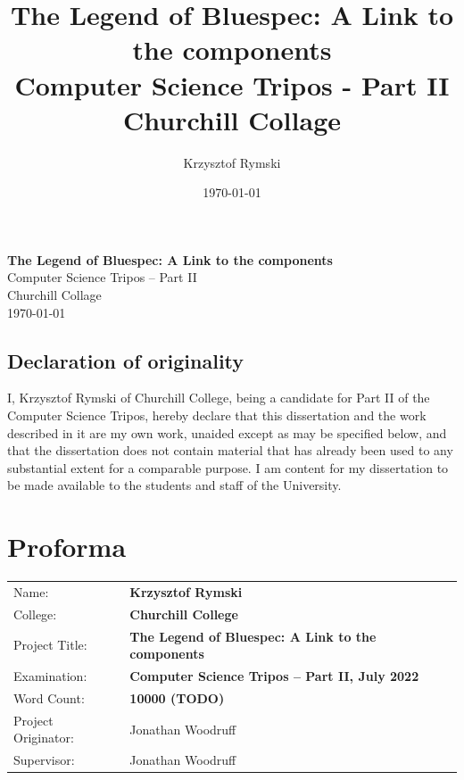 \documentclass[12pt]{report}
\title{The Legend of Bluespec: A Link to the components \\
\large Computer Science Tripos - Part II \\
Churchill Collage}
\date{\today}
\author{Krzysztof Rymski}
\begin{document}


\pagestyle{empty}


\vspace*{60mm}
\begin{center}
\Huge
\textbf{The Legend of Bluespec: A Link to the components} \\[5mm]
Computer Science Tripos -- Part II \\[5mm]
Churchill Collage \\[5mm]
\today  %
\end{center}

\newpage
\section*{Declaration of originality}

I, Krzysztof Rymski of Churchill College, being a candidate for Part II of the Computer Science Tripos, hereby declare that this dissertation and the work described in it are my own work, unaided except as may be specified below, and that the dissertation does not contain material that has already been used to any substantial extent for a comparable purpose. I am content for my dissertation to be made available to the students and staff of the University.

\bigskip
{}

\medskip
{}


\newpage

\pagestyle{plain}

\chapter*{Proforma}

{\large
\begin{tabular}{ll}
Name:               & \bf Krzysztof Rymski                      \\
College:            & \bf Churchill College                     \\
Project Title:      & \bf The Legend of Bluespec: A Link to the components \\
Examination:        & \bf Computer Science Tripos -- Part II, July 2022  \\
Word Count:         & \bf 10000 (TODO)\footnotemark[1]  \\
Project Originator: & Jonathan Woodruff                   \\
Supervisor:         & Jonathan Woodruff                    \\ 
\end{tabular}
}
\end{document}
